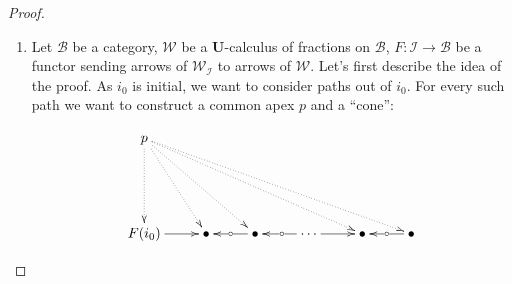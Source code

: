 \documentclass{article}
\numberwithin{equation}{section}
\theoremstyle{definition}
\theoremstyle{plain}
\begin{document}
\begin{proof}
\begin{enumerate}
Hence $(\widehat{\mathcal{I}},\widehat{\mathcal{W}}_{\mathcal{I}})$ is a \textbf{U}-calculus of fractions and we can apply $\textnormal{\textbf{U}-Frac}(\mathcal{I}, \mathcal{W}_{\mathcal{I}}, S)$ to the co-Yoneda embedding. We get an object $p$ apex of the resulting cone. Either $p$ is an object of $\mathcal{I}$, which implies that it was initial in $\mathcal{I}$ and hence initial in $\mathcal{I}[\mathcal{W}^{-1}_{\mathcal{I}}]$ too, or $p$ is an object of the form $\widehat{i_0}$. Let's consider the latter case that $p = \widehat{i_0}$. The projection $\pi_{i_0}$ of the cone at $i_0$ correspond to a path from $i_0$ to itself in the localization:

\[\xymatrix{
	&& \widehat{i_0}\ar@{.>}[ddll]_{[1_{i_0}] = \pi_{i_0}} \ar@{.>}[ddl] \ar@{.>}[dd] \ar@{.>}[ddrr] \ar@{.>}[ddrrr]^{\pi_{i_0}}\\
	\\
	i_0 \ar[r] & \bullet \ar@{<-}[r]|{\circ} & \bullet \ar@{<-}[r]|{\circ} & \cdots \ar[r] & \bullet \ar@{<-}[r]|{\circ} & i_0
}\]

By using the fact that we have a cone, we can walk our way back in the zig-zag defining $\pi_{i_0}$. At each step (going from right to left in the drawing), we see that the projection of the cone is equivalent to the path it ``covers''. Hence in the end we get $[1_{i_0}] = \pi_{i_0}$. Because it is a cone, we know that $\mathcal{I}[\mathcal{W}^{-1}_{\mathcal{I}}]$ is connected. Let $j: \mathcal{I}$. Now take any path $z$ from $i_0$ to $j$ in the localization. This time by walking our way forward in the path, we show that $\pi_j = [z]$. Hence we have shown that $i_0$ is initial in the localization, hence there exists an initial object. Furthermore, for any object $s$ of $S$, we know that $\pi_s$ is in $\widehat{\mathcal{W}}_{\mathcal{I}}$ and hence we get each time the second part of the criterion.

\item[$(\Leftarrow)$] Let $\mathcal{B}$ be a category, $\mathcal{W}$ be a \textbf{U}-calculus of fractions on $\mathcal{B}$, $F:\mathcal{I} \to \mathcal{B}$ be a functor sending arrows of $\mathcal{W}_{\mathcal{I}}$ to arrows of $\mathcal{W}$. Let's first describe the idea of the proof. As $i_0$ is initial, we want to consider paths out of $i_0$. For every such path we want to construct a common apex $p$ and a ``cone'':

\[\xymatrix{
	p\ar@{.>}[dd] \ar@{.>}[ddr] \ar@{.>}[ddrr] \ar@{.>}[ddrrrr] \ar@{.>}[ddrrrrr]\\
	\\
	F(i_0) \ar[r] & \bullet \ar@{<-}[r]|{\circ} & \bullet \ar@{<-}[r]|{\circ} & \cdots \ar[r] & \bullet \ar@{<-}[r]|{\circ} & \bullet
}\]


\end{enumerate}
\end{proof}
\end{document}
